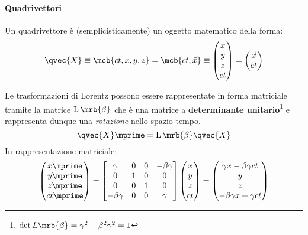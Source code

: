 \paragraph{Quadrivettori}
Un quadrivettore è (semplicisticamente) un oggetto matematico della forma:
\begin{equation}
  \qvec{X} \equiv
  \mcb{ct, x, y, z}
  = \mcb{ct, \vec{x}}
  \equiv
  \begin{pmatrix}
    x \\
	  y \\
	  z \\
	  ct
  \end{pmatrix}
  =
  \begin{pmatrix}
    \vec{x} \\
	  ct
  \end{pmatrix}
\end{equation}

Le trasformazioni di Lorentz possono essere rappresentate in forma matriciale
tramite la matrice $\operatorname{L}\mrb{\beta}$ che è una matrice a
\textbf{determinante unitario}\footnote{
  $\det L \mrb{\beta} = \gamma ^{2} - \beta ^{2} \gamma ^{2} = 1$
} e rappresenta dunque una \textit{rotazione} nello spazio-tempo.
\begin{equation}
  \qvec{X}\mprime = \operatorname{L}\mrb{\beta} \qvec{X}
\end{equation}
In rappresentazione matriciale:
\begin{equation}
  \begin{pmatrix}
    x \mprime \\
    y \mprime \\
    z \mprime \\
    ct \mprime
  \end{pmatrix} = 
  \begin{bmatrix}
    \gamma & 0 & 0 & -\beta \gamma \\
    0 & 1 & 0 & 0 \\
    0 & 0 & 1 & 0 \\
    -\beta \gamma & 0 & 0 & \gamma
  \end{bmatrix}
  \begin{pmatrix}
    x \\
    y \\
    z \\
    ct
  \end{pmatrix}
  =
  \begin{pmatrix}
    \gamma x - \beta \gamma ct \\
    y \\
    z \\
    -\beta \gamma x + \gamma ct
  \end{pmatrix}
\end{equation}

